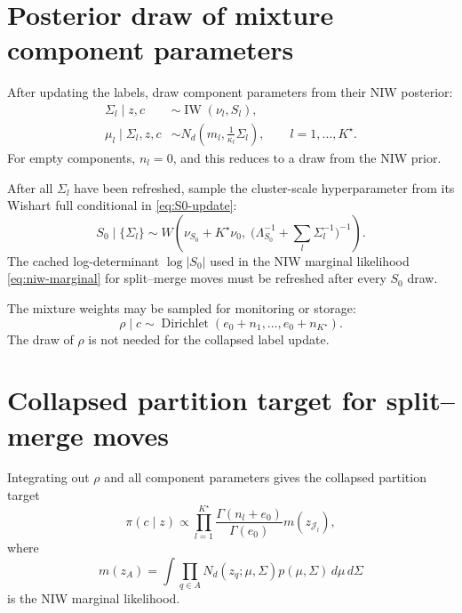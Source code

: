 \documentclass[11pt]{article}
\DeclareMathOperator{\Dir}{Dirichlet}
\DeclareMathOperator{\IW}{IW}
\begin{document}
\section{Posterior draw of mixture component parameters}

After updating the labels, draw component parameters from their NIW posterior:
\begin{align}
    \Sigma_l\mid z,c
    &\sim \IW(\nu_l,S_l),
    \label{eq:sigma-posterior}\\
    \mu_l\mid \Sigma_l,z,c
    &\sim N_d\left(m_l,\frac{1}{\kappa_l}\Sigma_l\right),
    \qquad l=1,\dots,K^\star.
    \label{eq:mu-posterior}
\end{align}
For empty components, $n_l=0$, and this reduces to a draw from the NIW prior.

After all $\Sigma_l$ have been refreshed, sample the cluster-scale
hyperparameter from its Wishart full conditional in
\eqref{eq:S0-update}:
\begin{equation}
    S_0\mid\{\Sigma_l\}
    \sim
    W\!\left(
    \nu_{S_0}+K^\star\nu_0,\;
    \bigl(\Lambda_{S_0}^{-1}+\textstyle\sum_l\Sigma_l^{-1}\bigr)^{-1}
    \right).
    \label{eq:S0-gibbs}
\end{equation}
The cached log-determinant $\log|S_0|$ used in the NIW marginal likelihood
\eqref{eq:niw-marginal} for split--merge moves must be refreshed after every
$S_0$ draw.

The mixture weights may be sampled for monitoring or storage:
\begin{equation}
    \rho\mid c
    \sim
    \Dir(e_0+n_1,\dots,e_0+n_{K^\star}).
    \label{eq:rho-posterior}
\end{equation}
The draw of $\rho$ is not needed for the collapsed label update.

\section{Collapsed partition target for split--merge moves}

Integrating out $\rho$ and all component parameters gives the collapsed
partition target
\begin{equation}
    \pi(c\mid z)
    \propto
    \prod_{l=1}^{K^\star}
    \frac{\Gamma(n_l+e_0)}{\Gamma(e_0)}
    m(z_{\mathcal J_l}),
    \label{eq:collapsed-partition-target}
\end{equation}
where
\begin{equation}
    m(z_A)
    =
    \int
    \prod_{q\in A}N_d(z_q;\mu,\Sigma)
    p(\mu,\Sigma)\,d\mu\,d\Sigma
\end{equation}
is the NIW marginal likelihood.
\end{document}
